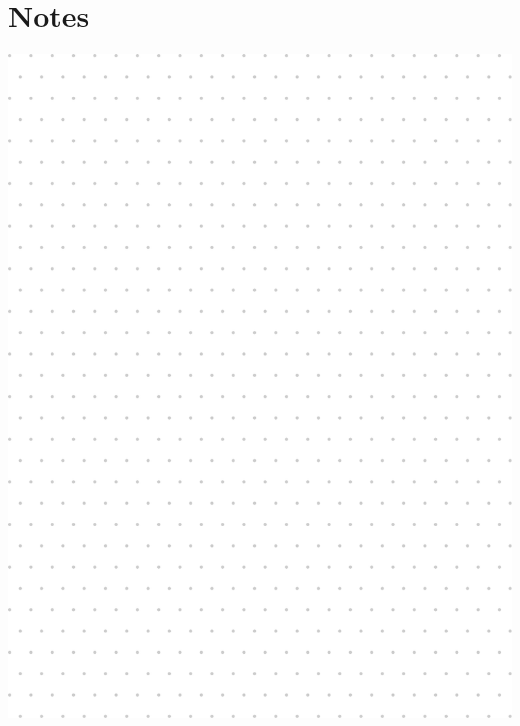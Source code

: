 \documentclass[
	openany, %
	parskip=full, %
	12pt, %
	a4paper, %
]{conferencebooklet} %
\begin{document}
\chapter*{Notes}
\includegraphics[width=\textwidth]{notes/notes-initial.pdf}
\end{document}
